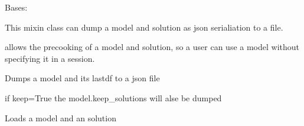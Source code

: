 \documentclass[letterpaper,10pt,english]{sphinxmanual}
\begin{document}
\begin{fulllineitems}
\label{\detokenize{core/modelclass:modelclass.Json_Mixin}}
\pysigstartsignatures
{}
\pysigstopsignatures
\sphinxAtStartPar
Bases: 

\sphinxAtStartPar
This mixin class can dump a model and solution
as json serialiation to a file.

\sphinxAtStartPar
allows the precooking of a model and solution, so
a user can use a model without specifying it in
a session.

\begin{fulllineitems}
\label{\detokenize{core/modelclass:modelclass.Json_Mixin.modeldump}}
\pysigstartsignatures
{}
\pysigstopsignatures
\sphinxAtStartPar
Dumps a model and its lastdf to a json file

\sphinxAtStartPar
if keep=True the model.keep\_solutions will alse be dumped

\end{fulllineitems}


\begin{fulllineitems}
\label{\detokenize{core/modelclass:modelclass.Json_Mixin.modelload}}
\pysigstartsignatures
{}
\pysigstopsignatures
\sphinxAtStartPar
Loads a model and an solution

\end{fulllineitems}


\end{fulllineitems}
\end{document}
